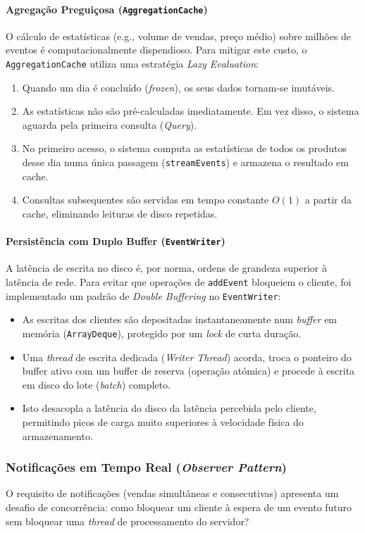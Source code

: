\documentclass{article}
\begin{document}
\paragraph{Agregação Preguiçosa (\texttt{AggregationCache})}
O cálculo de estatísticas (e.g., volume de vendas, preço médio) sobre milhões de eventos é computacionalmente dispendioso. Para mitigar este custo, o \texttt{AggregationCache} utiliza uma estratégia \textit{Lazy Evaluation}:
\begin{enumerate}
    \item Quando um dia é concluído (\textit{frozen}), os seus dados tornam-se imutáveis.
    \item As estatísticas não são pré-calculadas imediatamente. Em vez disso, o sistema aguarda pela primeira consulta (\textit{Query}).
    \item No primeiro acesso, o sistema computa as estatísticas de todos os produtos desse dia numa única passagem (\texttt{streamEvents}) e armazena o resultado em cache.
    \item Consultas subsequentes são servidas em tempo constante $O(1)$ a partir da cache, eliminando leituras de disco repetidas.
\end{enumerate}

\paragraph{Persistência com Duplo Buffer (\texttt{EventWriter})}
A latência de escrita no disco é, por norma, ordens de grandeza superior à latência de rede. Para evitar que operações de \texttt{addEvent} bloqueiem o cliente, foi implementado um padrão de \textit{Double Buffering} no \texttt{EventWriter}:
\begin{itemize}
    \item As escritas dos clientes são depositadas instantaneamente num \textit{buffer} em memória (\texttt{ArrayDeque}), protegido por um \textit{lock} de curta duração.
    \item Uma \textit{thread} de escrita dedicada (\textit{Writer Thread}) acorda, troca o ponteiro do buffer ativo com um buffer de reserva (operação atómica) e procede à escrita em disco do lote (\textit{batch}) completo.
    \item Isto desacopla a latência do disco da latência percebida pelo cliente, permitindo picos de carga muito superiores à velocidade física do armazenamento.
\end{itemize}

\subsubsection{Notificações em Tempo Real (\textit{Observer Pattern})}
O requisito de notificações (vendas simultâneas e consecutivas) apresenta um desafio de concorrência: como bloquear um cliente à espera de um evento futuro sem bloquear uma \textit{thread} de processamento do servidor?
\end{document}
